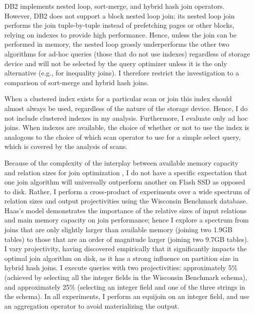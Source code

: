 DB2 implements nested loop, sort-merge, and hybrid hash join operators.  
However, DB2 does not support a block nested loop join; its nested loop join performs the join tuple-by-tuple instead of prefetching pages or other blocks, relying on indexes to provide high performance.
Hence, unless the join can be performed in memory, the nested loop grossly underperforms the other two algorithms for ad-hoc queries (those that do not use indexes) regardless of storage device and will not be selected by the query optimizer unless it is the only alternative (e.g., for inequality joins). 
I therefore restrict the investigation to a comparison of sort-merge and hybrid hash joins.

When a clustered index exists for a particular scan or join this index should almost always be used, regardless of the nature of the storage device.  
Hence, I do not include clustered indexes in my analysis.
Furthermore, I evaluate only ad hoc joins.
When indexes are available, the choice of whether or not to use the index is analogous to the choice of which scan operator to use for a simple select query, which is covered by the analysis of scans.

Because of the complexity of the interplay between available memory capacity and relation sizes for join optimization \cite{DBLP:journals/vldb/HaasCLS97}, I do not have a specific expectation that one join algorithm will universally outperform another on Flash SSD as opposed to disk.
Rather, I perform a cross-product of experiments over a wide spectrum of relation sizes and output projectivities using the Wisconsin Benchmark database.  
Haas's model demonstrates the importance of the relative sizes of input relations and main memory capacity on join performance; hence I explore a spectrum from joins that are only slightly larger than available memory (joining two 1.9GB tables) to those that are an order of magnitude larger (joining two 9.7GB tables).   
I vary projectivity, having discovered empirically that it significantly impacts the optimal join algorithm on disk, as it has a strong influence on partition size in hybrid hash joins.
I execute queries with two projectivities: approximately 5\% (achieved by selecting all the integer fields in the Wisconsin Benchmark schema), and approximately 25\% (selecting an integer field and one of the three strings in the schema).
In all experiments, I perform an equijoin on an integer field, and use an aggregation operator to avoid materializing the output.



